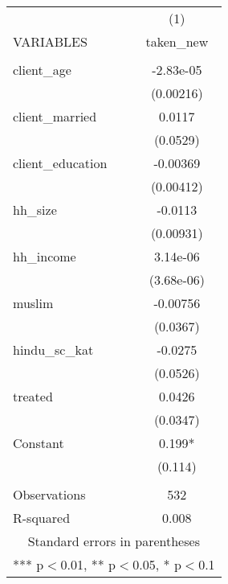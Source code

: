 \begin{tabular}{lc} \hline
 & (1) \\
VARIABLES & taken\_new \\ \hline
 &  \\
client\_age & -2.83e-05 \\
 & (0.00216) \\
client\_married & 0.0117 \\
 & (0.0529) \\
client\_education & -0.00369 \\
 & (0.00412) \\
hh\_size & -0.0113 \\
 & (0.00931) \\
hh\_income & 3.14e-06 \\
 & (3.68e-06) \\
muslim & -0.00756 \\
 & (0.0367) \\
hindu\_sc\_kat & -0.0275 \\
 & (0.0526) \\
treated & 0.0426 \\
 & (0.0347) \\
Constant & 0.199* \\
 & (0.114) \\
 &  \\
Observations & 532 \\
 R-squared & 0.008 \\ \hline
\multicolumn{2}{c}{ Standard errors in parentheses} \\
\multicolumn{2}{c}{ *** p$<$0.01, ** p$<$0.05, * p$<$0.1} \\
\end{tabular}
